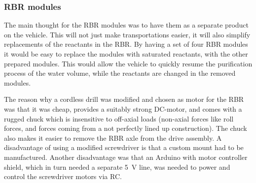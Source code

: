 
\subsubsection{RBR modules}

The main thought for the RBR modules was to have them as a separate product on the vehicle. This will not just make transportations easier, it will also simplify replacements of the reactants in the RBR. By having a set of four RBR modules it would be easy to replace the modules with saturated reactants, with the other prepared modules. This would allow the vehicle to quickly resume the purification process of the water volume, while the reactants are changed in the removed modules. %

The reason why a cordless drill was modified and chosen as motor for the RBR was that it was cheap, provides a suitably strong DC-motor, and comes with a rugged chuck which is insensitive to off-axial loads (non-axial forces like roll forces, and forces coming from a not perfectly lined up construction). The chuck also makes it easier to remove the RBR axle from the drive assembly. A disadvantage of using a modified screwdriver is that a custom mount had to be manufactured. Another disadvantage was that an Arduino with motor controller shield, which in turn needed a separate 5~V line, was needed to power and control the screwdriver motors via RC. %





